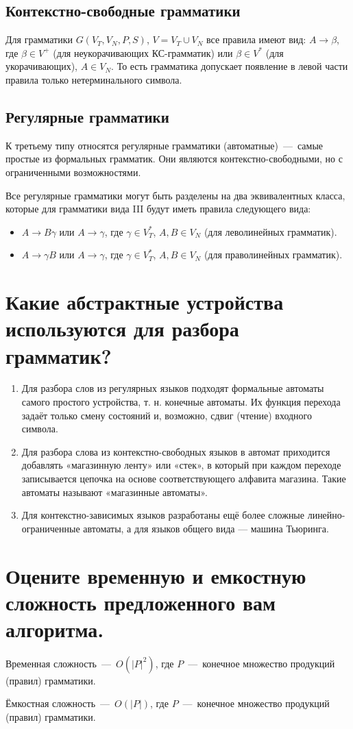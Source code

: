 \subsection{Контекстно-свободные грамматики}
Для грамматики $G(V_{T},V_{N},P,S)$, $V=V_{T}\cup V_{N}$ все правила имеют вид: $A\rightarrow \beta$, где $\beta \in V^{+}$ (для неукорачивающих КС-грамматик) или $\beta \in V^{*}$ (для укорачивающих), 
$A\in V_{N}$. То есть грамматика допускает появление в левой части правила только нетерминального символа.

\subsection{Регулярные грамматики}
К третьему типу относятся регулярные грамматики (автоматные)~---~самые простые из формальных грамматик. Они являются контекстно-свободными, но с ограниченными возможностями.

Все регулярные грамматики могут быть разделены на два эквивалентных класса, которые для грамматики вида III будут иметь правила следующего вида:
\begin{itemize}
	\item $A\rightarrow B\gamma$ или $A\rightarrow \gamma$, где $\gamma \in V_{T}^{*}$, $A,B\in V_{N}$ (для леволинейных грамматик).
	\item $A\rightarrow \gamma B$ или $A\rightarrow \gamma$, где $\gamma \in V_{T}^{*}$, $A,B\in V_{N}$ (для праволинейных грамматик).
\end{itemize}

\section{Какие абстрактные устройства используются для разбора грамматик?}
\begin{enumerate}
	\item Для разбора слов из регулярных языков подходят формальные автоматы самого простого устройства, т. н. конечные автоматы. Их функция перехода задаёт только смену состояний и, возможно, сдвиг (чтение) входного символа.
	\item Для разбора слова из контекстно-свободных языков в автомат приходится добавлять «магазинную ленту» или «стек», в который при каждом переходе записывается цепочка на основе соответствующего алфавита магазина. Такие автоматы называют «магазинные автоматы».
	\item Для контекстно-зависимых языков разработаны ещё более сложные линейно-ограниченные автоматы, а для языков общего вида — машина Тьюринга.
\end{enumerate}

\section{Оцените временную и емкостную сложность предложенного вам алгоритма.}

Временная сложность~---~$O(|P|^2)$, где $P$~---~конечное множество продукций (правил) грамматики.

Ёмкостная сложность~---~$O(|P|)$, где $P$~---~конечное множество продукций (правил) грамматики.